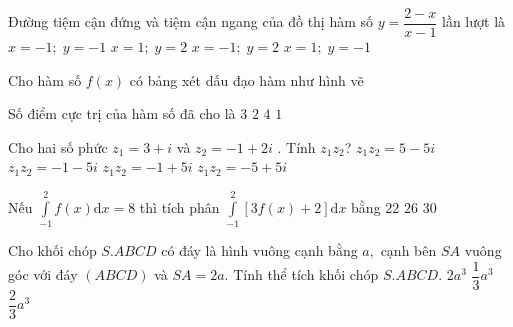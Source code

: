 \begin{ex}%
	Đường tiệm cận đứng và tiệm cận ngang của đồ thị hàm số $y=\dfrac{2-x}{x-1}$ lần lượt là 
	\choice
	{$x=-1;\;y=-1$}
	{$x=1;\;y=2$}
	{$x=-1;\;y=2$}
	{\True $x=1;\;y=-1$}
\end{ex}

\begin{ex}%
	Cho hàm số $f(x)$ có bảng xét dấu đạo hàm như hình vẽ
	\begin{center}
	\end{center}
	Số điểm cực trị của hàm số đã cho là
	\choice
	{$3$}
	{$2$}
	{\True $4$}
	{$1$}
\end{ex}
\begin{ex}%
	Cho hai số phức $z_1=3+i$ và $z_2=-1+2i$ . Tính $z_1z_2$?
	\choice
	{$z_1z_2=5-5i$}
	{$z_1z_2=-1-5i$}
	{$z_1z_2=-1+5i$}
	{\True $z_1z_2=-5+5i$}
\end{ex}
	\begin{ex}%
	Nếu $\displaystyle\int\limits_{-1}^2f(x)\text{d}x=8$ thì tích phân $\displaystyle\int\limits_{-1}^2{\left[ 3f\left( x \right)+2 \right]\text{d}x}$ bằng
	{ $22$}
	{ $26$}
	{\True $30$}
\end{ex}
\begin{ex}%
	Cho khối chóp $S.ABCD$ có đáy là hình vuông cạnh bằng $a,$ cạnh bên $SA$ vuông góc với đáy $(ABCD)$ và $SA=2a.$ Tính thể tích khối chóp $S.ABCD$.
	{ $2a^3$}
	{ $\dfrac{1}{3}{a^3}$}
	{\True $\dfrac{2}{3}a^3$}
\end{ex}
